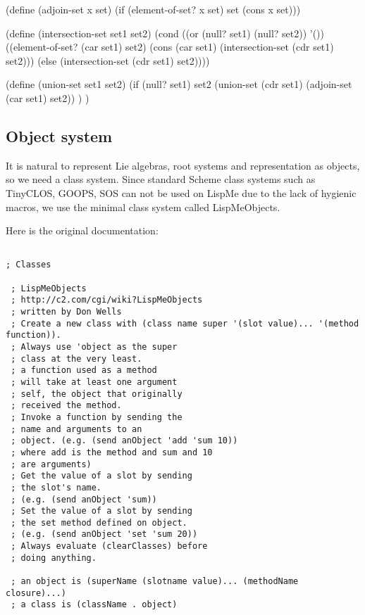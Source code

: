 \documentclass[a4paper,10pt]{article}
\theoremstyle{definition} \newtheorem{Def}{Definition}
\begin{document}
(define (adjoin-set x set)
  (if (element-of-set? x set)
      set
      (cons x set)))

(define (intersection-set set1 set2)
  (cond ((or (null? set1) (null? set2)) '())
        ((element-of-set? (car set1) set2)        
         (cons (car set1)
               (intersection-set (cdr set1) set2)))
        (else (intersection-set (cdr set1) set2))))

(define (union-set set1 set2)
        (if (null? set1) set2
                (union-set (cdr set1)
                           (adjoin-set (car set1) set2))
        )
)

\nwendcode{}\nwdocspar

\subsection{Object system}
\label{sec:object-system}

It is natural to represent Lie algebras, root systems and representation as objects, so we need a class system. Since standard Scheme class systems such as TinyCLOS, GOOPS, SOS can not be used on LispMe due to the lack of hygienic macros, we use the minimal class system called LispMeObjects.

Here is the original documentation:
\begin{verbatim}
  
; Classes

 ; LispMeObjects
 ; http://c2.com/cgi/wiki?LispMeObjects
 ; written by Don Wells
 ; Create a new class with (class name super '(slot value)... '(method function)).
 ; Always use 'object as the super
 ; class at the very least.
 ; a function used as a method 
 ; will take at least one argument 
 ; self, the object that originally
 ; received the method.
 ; Invoke a function by sending the 
 ; name and arguments to an
 ; object. (e.g. (send anObject 'add 'sum 10))
 ; where add is the method and sum and 10
 ; are arguments)
 ; Get the value of a slot by sending
 ; the slot's name.
 ; (e.g. (send anObject 'sum))
 ; Set the value of a slot by sending
 ; the set method defined on object.
 ; (e.g. (send anObject 'set 'sum 20))
 ; Always evaluate (clearClasses) before
 ; doing anything.

 ; an object is (superName (slotname value)... (methodName closure)...)
 ; a class is (className . object)

\end{verbatim}
\end{document}
